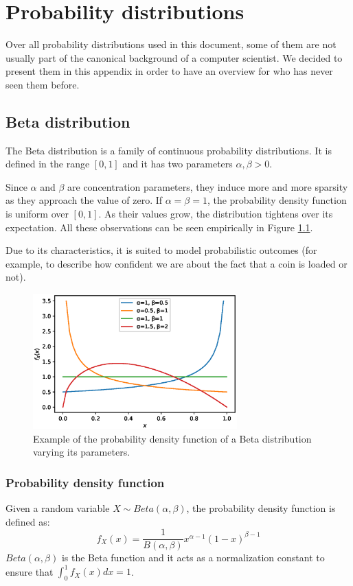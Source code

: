 \chapter{Probability distributions}
Over all probability distributions used in this document, some of them are not usually part of the canonical background of a computer scientist.
We decided to present them in this appendix in order to have an overview for who has never seen them before.

\section{Beta distribution} \label{betad}
The Beta distribution is a family of continuous probability distributions.
It is defined in the range $[0, 1]$ and it has two parameters $\alpha,\beta > 0$.

Since $\alpha$ and $\beta$ are concentration parameters, they induce more and more sparsity as they approach the value of zero.
If $\alpha = \beta = 1$, the probability density function is uniform over $[0, 1]$.
As their values grow, the distribution tightens over its expectation.
All these observations can be seen empirically in Figure \ref{fig:betaparams}.

Due to its characteristics, it is suited to model probabilistic outcomes (for example, to describe how confident we are about the fact that a coin is loaded or not).

\begin{figure}[H]
    \centering
    \includegraphics[width=0.7\textwidth]{images/beta}
    \caption{Example of the probability density function of a Beta distribution varying its parameters.}
    \label{fig:betaparams}
\end{figure}

\subsection{Probability density function}
Given a random variable $X \sim Beta(\alpha, \beta)$, the probability density function is defined as:
$$f_X(x) = \frac{1}{B(\alpha, \beta)}x^{\alpha - 1}(1-x)^{\beta - 1}$$
$Beta(\alpha, \beta)$ is the Beta function and it acts as a normalization constant to ensure that $\int_0^1 f_X(x) dx = 1$.

